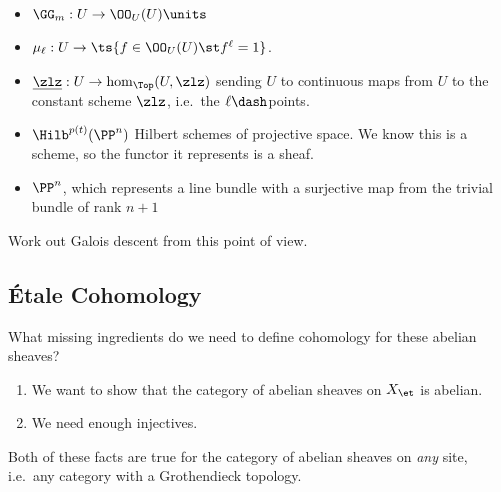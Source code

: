 \begin{example}[of sheaves]

\envlist

\begin{itemize}
\tightlist
\item
  \(\GG_m: U \to \OO_U(U)\units\)
\item
  \(\mu_\ell: U\to \ts{f\in \OO_U(U) \st f^\ell = 1}\).
\item
  \(\underline{\zlz}: U\to \hom_{\Top}(U, \zlz)\) sending \(U\) to
  continuous maps from \(U\) to the constant scheme \(\zlz\), i.e.~the
  \(\ell\dash\)points.
\item
  \(\Hilb^{p(t)}(\PP^n)\) Hilbert schemes of projective space. We know
  this is a scheme, so the functor it represents is a sheaf.
\item
  \(\PP^n\), which represents a line bundle with a surjective map from
  the trivial bundle of rank \(n+1\)
\end{itemize}

\end{example}

\begin{exercise}[?]

Work out Galois descent from this point of view.

\end{exercise}

\hypertarget{uxe9tale-cohomology}{%
\subsection{Étale Cohomology}\label{uxe9tale-cohomology}}

What missing ingredients do we need to define cohomology for these
abelian sheaves?

\begin{enumerate}
\def\labelenumi{\arabic{enumi}.}
\tightlist
\item
  We want to show that the category of abelian sheaves on \(X_{\et}\) is
  abelian.
\item
  We need enough injectives.
\end{enumerate}

\begin{remark}

Both of these facts are true for the category of abelian sheaves on
\emph{any} site, i.e.~any category with a Grothendieck topology.

\end{remark}

